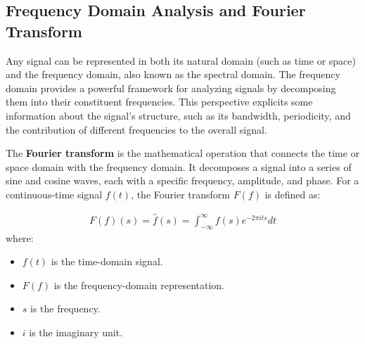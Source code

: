 



\subsection{Frequency Domain Analysis and Fourier Transform}

Any signal can be represented in both its natural domain (such as time or space) and the frequency domain, also known as the spectral domain. The frequency domain provides a powerful framework for analyzing signals by decomposing them into their constituent frequencies. This perspective explicits some information about the signal's structure, such as its bandwidth, periodicity, and the contribution of different frequencies to the overall signal.

The \textbf{Fourier transform} is the mathematical operation that connects the time or space domain with the frequency domain. It decomposes a signal into a series of sine and cosine waves, each with a specific frequency, amplitude, and phase. For a continuous-time signal \( f(t) \), the Fourier transform \( F(f) \) is defined as:

\begin{align}
  F(f)(s) = \hat{f}(s) = \int_{-\infty}^{\infty} f(s) e^{-2\pi i t s} dt
\end{align}
where:

\begin{itemize}
  \item \( f(t) \) is the time-domain signal.
  \item \( F(f) \) is the frequency-domain representation.
  \item \( s \) is the frequency.
  \item \( i \) is the imaginary unit.
\end{itemize}


